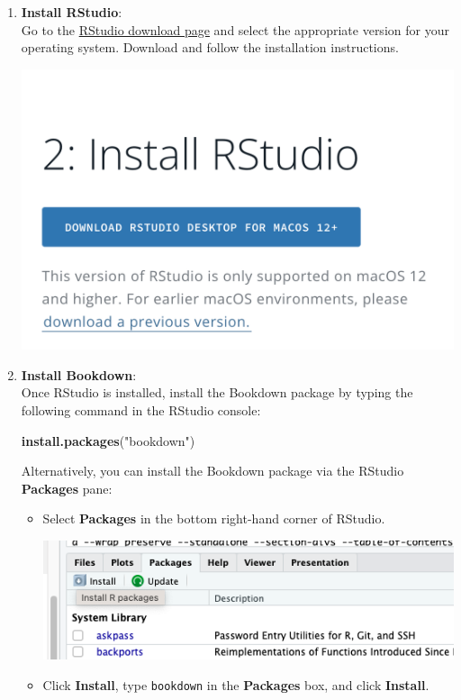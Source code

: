 \documentclass[
]{book}
\newenvironment{Shaded}{\begin{snugshade}}{\end{snugshade}}
\newcommand{\FunctionTok}[1]{\textcolor[rgb]{0.13,0.29,0.53}{\textbf{#1}}}
\newcommand{\NormalTok}[1]{#1}
\newcommand{\StringTok}[1]{\textcolor[rgb]{0.31,0.60,0.02}{#1}}
\theoremstyle{definition}
\theoremstyle{definition}
\theoremstyle{definition}
\theoremstyle{definition}
\theoremstyle{remark}
\begin{document}
\begin{enumerate}
\def\labelenumi{\arabic{enumi}.}
\setcounter{enumi}{1}
\item
  \textbf{Install RStudio}:\\
  Go to the \href{https://posit.co/download/rstudio-desktop/}{RStudio download page} and select the appropriate version for your operating system. Download and follow the installation instructions.

  \includegraphics[width=16.83in]{images/tutorialscreenshots/installRStudio}
\item
  \textbf{Install Bookdown}:\\
  Once RStudio is installed, install the Bookdown package by typing the following command in the RStudio console:

\begin{Shaded}
\begin{Highlighting}[]
\FunctionTok{install.packages}\NormalTok{(}\StringTok{"bookdown"}\NormalTok{)}
\end{Highlighting}
\end{Shaded}

  Alternatively, you can install the Bookdown package via the RStudio \textbf{Packages} pane:

  \begin{itemize}
  \item
    Select \textbf{Packages} in the bottom right-hand corner of RStudio.

    \includegraphics[width=7in]{images/tutorialscreenshots/installPackage}
  \item
    Click \textbf{Install}, type \texttt{bookdown} in the \textbf{Packages} box, and click \textbf{Install}.


\end{itemize}
\end{enumerate}
\end{document}
